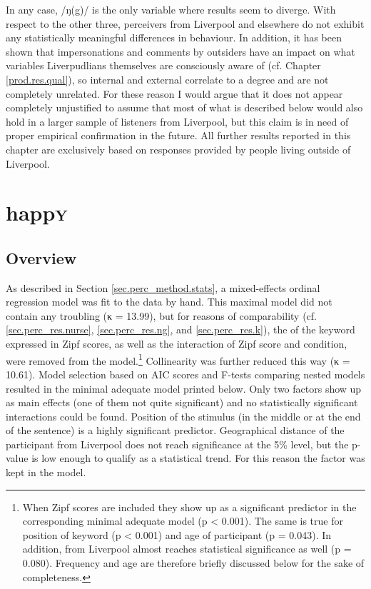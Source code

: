 In any case, /ŋ(g)/ is the only variable where results seem to diverge.
With respect to the other three, perceivers from Liverpool and elsewhere do not exhibit any statistically meaningful differences in behaviour.
In addition, it has been shown that impersonations and comments by outsiders have an impact on what variables Liverpudlians themselves are consciously aware of (cf. Chapter \ref{prod.res.qual}), so internal and external  correlate to a degree and are not completely unrelated.
For these reason I would argue that it does not appear completely unjustified to assume that most of what is described below would also hold in a larger sample of listeners from Liverpool, but this claim is in need of proper empirical confirmation in the future.
All further results reported in this chapter are exclusively based on responses provided by people living outside of Liverpool.

\section{happ\textsc{y}}
\label{sec.perc_res.happy}
	\subsection{Overview}
	\label{sec.perc_res.happy.overview}

As described in Section \ref{sec.perc_method.stats}, a mixed-effects ordinal regression model was fit to the data by hand.
This maximal model did not contain any troubling  (κ = 13.99), but for reasons of comparability (cf. \ref{sec.perc_res.nurse}, \ref{sec.perc_res.ng}, and \ref{sec.perc_res.k}), the  of the keyword expressed in Zipf scores, as well as the interaction of Zipf score and  condition, were removed from the model.\footnote{When Zipf scores are included they show up as a significant predictor in the corresponding minimal adequate model (p < 0.001). The same is true for position of keyword (p < 0.001) and age of participant (p = 0.043). In addition,  from Liverpool almost reaches statistical significance as well (p = 0.080). Frequency and age are therefore briefly discussed below for the sake of completeness.}
Collinearity was further reduced this way (κ = 10.61).
Model selection based on AIC scores and F-tests comparing nested models resulted in the minimal adequate model printed below.
Only two factors show up as main effects (one of them not quite significant) and no statistically significant interactions could be found.
Position of the stimulus (in the middle or at the end of the sentence) is a highly significant predictor.
Geographical distance of the participant from Liverpool does not reach significance at the 5\% level, but the p-value is low enough to qualify as a statistical trend.
For this reason the factor was kept in the model.

